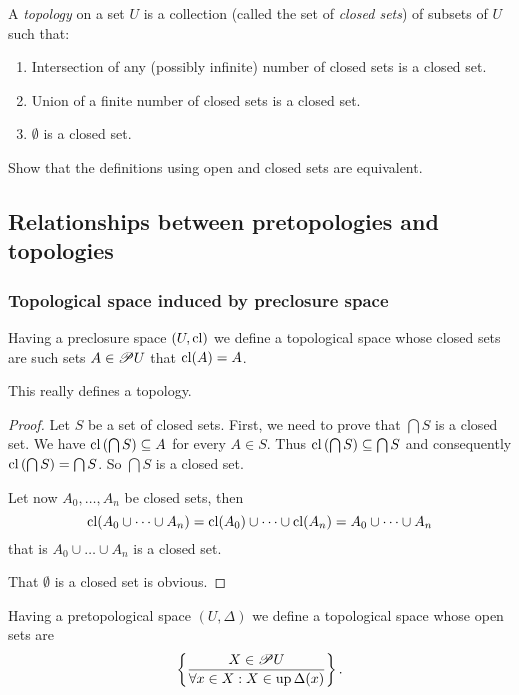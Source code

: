 A \emph{topology} on a set $U$ is a collection (called the set of
\emph{closed sets}) of subsets of $U$ such that:
\begin{enumerate}
\item Intersection of any (possibly infinite) number of closed sets is a
closed set.
\item Union of a finite number of closed sets is a closed set.
\item $\emptyset$ is a closed set.\end{enumerate}
\begin{xca}
Show that the definitions using open and closed sets are equivalent.
\end{xca}

\subsection{Relationships between pretopologies and topologies}


\subsubsection{Topological space induced by preclosure space}

Having a preclosure
space $(U,\operatorname{cl})$ we define a topological space whose closed sets are
such sets $A\in\mathscr{P} U$ that $\operatorname{cl}(A)=A$.
\begin{prop}
This really defines a topology.\end{prop}
\begin{proof}
Let $S$ be a set of closed sets. First, we need to prove that $\bigcap S$
is a closed set. We have $\operatorname{cl}\left(\bigcap S\right)\subseteq A$ for
every $A\in S$. Thus $\operatorname{cl}\left(\bigcap S\right)\subseteq\bigcap S$
and consequently $\operatorname{cl}\left(\bigcap S\right)=\bigcap S$. So $\bigcap S$
is a closed set.

Let now $A_{0},\dots,A_{n}$ be closed sets, then
\[
\operatorname{cl}(A_{0}\cup\dots\cup A_{n})=\operatorname{cl}(A_{0})\cup\dots\cup\operatorname{cl}(A_{n})=A_{0}\cup\dots\cup A_{n}
\]
that is $A_{0}\cup\dots\cup A_{n}$ is a closed set.

That $\emptyset$ is a closed set is obvious.
\end{proof}
Having a pretopological space $(U,\Delta)$ we define a topological
space whose open sets are
\[
\left\{ \frac{X\in\mathscr{P} U}{\forall x\in X:X\in\operatorname{up}\Delta(x)}\right\}.
\]

